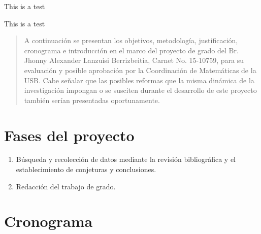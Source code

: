 \documentclass[12pt]{article}
\begin{document}
    \maketitle
    \thispagestyle{empty}

    \pagebreak

    {
        \fontsize{70}{70}\selectfont This is a test
    }

    {
        \normalsize This is a test
    }

    \begin{abstract}
        A continuación se presentan los objetivos, metodología, justificación,
        cronograma e introducción en el marco del proyecto de grado del
        Br. Jhonny Alexander Lanzuisi Berrizbeitia, Carnet No. 15-10759, para su
        evaluación y posible aprobación por la Coordinación de Matemáticas de
        la USB. Cabe señalar que las posibles reformas que la misma dinámica
        de la investigación impongan o se susciten durante el desarrollo de
        este proyecto también serían presentadas oportunamente.
    \end{abstract}

    \section{Fases del proyecto}

    \begin{enumerate}[label=\Roman*.]
        \item Búsqueda y recolección de datos mediante la revisión
              bibliográfica y el establecimiento de conjeturas y conclusiones.
        \item Redacción del trabajo de grado.
    \end{enumerate}

    \section{Cronograma}
\end{document}
